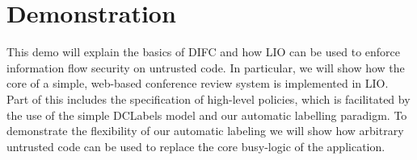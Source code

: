\section{Demonstration}
\label{sec:demo}
This demo will explain the basics of DIFC and how LIO can be
used to enforce information flow security on untrusted code.
%
In particular, we will show how the core of a simple, web-based
conference review system is implemented in LIO.
%
Part of this includes the specification of high-level policies, which
is facilitated by the use of the simple DCLabels model and our
automatic labelling paradigm.
%
To demonstrate the flexibility of our automatic labeling we will show
how arbitrary untrusted code can be used to replace the core
busy-logic of the application.
